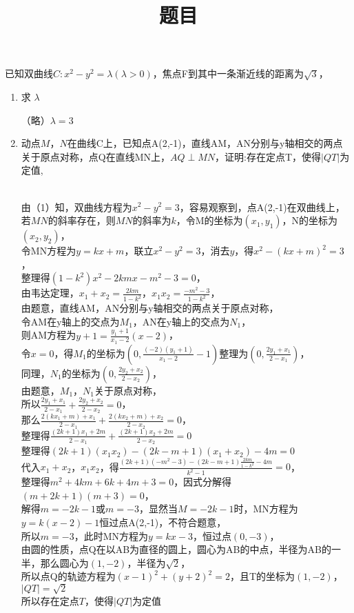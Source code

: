 \documentclass{exam-zh}
\title{题目}
\begin{document}
\begin{problem}
  已知双曲线$C:x^2-y^2=\lambda(\lambda>0)$，焦点F到其中一条渐近线的距离为$\sqrt{3}$，
  \begin{enumerate}
    \item 求 $ \lambda $ 
    \begin{solution}
      （略）$\lambda = 3$ 
    \end{solution}

    \item 动点$M$，$N$在曲线C上，已知点A(2,-1)，直线AM，AN分别与y轴相交的两点关于原点对称，点Q在直线MN上，$AQ\perp MN$，证明:存在定点T，使得$|QT|$为定值,
    \begin{solution}
\\      由（1）知，双曲线方程为$x^2-y^2=3$，容易观察到，点A(2,-1)在双曲线上，
\\     若$MN$的斜率存在，则$MN$的斜率为$k$，令M的坐标为$(x_1,y_1)$，N的坐标为$(x_2,y_2)$，
\\     令MN方程为$y=kx+m$，联立$x^2-y^2=3$，消去$y$，得$x^2-(kx+m)^2=3$，
\\     整理得$(1-k^2)x^2-2kmx-m^2-3=0$，
\\     由韦达定理，$x_1+x_2=\frac{2km}{1-k^2}$，$x_1x_2=\frac{-m^2-3}{1-k^2}$，
\\     由题意，直线AM，AN分别与y轴相交的两点关于原点对称，
\\     令AM在y轴上的交点为$M_1$，AN在y轴上的交点为$N_1$，
\\      则AM方程为$y+1=\frac{y_1+1}{x_1-2}(x-2)$，
\\      令$x=0$，得$M_1$的坐标为$(0,\frac{(-2)(y_1+1)}{x_1-2}-1)$整理为$(0,\frac{2y_1+x_1}{2-x_1})$，
\\      同理，$N_1$的坐标为$(0,\frac{2y_2+x_2}{2-x_2})$，
\\      由题意，$M_1$，$N_1$关于原点对称，
\\      所以$\frac{2y_1+x_1}{2-x_1}+\frac{2y_2+x_2}{2-x_2}=0$，
\\      那么$\frac{2(kx_1+m)+x_1}{2-x_1}+\frac{2(kx_2+m)+x_2}{2-x_2}=0$，
\\     整理得$\frac{(2k+1)x_1+2m}{2-x_1}+\frac{(2k+1)x_2+2m}{2-x_2}=0$
\\      整理得$(2k+1)(x_1x_2)-(2k-m+1)(x_1+x_2)-4m=0$
\\       代入$x_1+x_2$，$x_1x_2$，得$\frac{(2k+1)(-m^2-3)-(2k-m+1)\frac{2km}{1-k^2}-4m}{k^2-1}=0$，
\\     整理得$m^2+4km+6k+4m+3=0$，因式分解得$(m+2k+1)(m+3)=0$，
\\      解得$m=-2k-1$或$m=-3$，显然当$M=-2k-1$时，MN方程为$y=k(x-2)-1$恒过点A(2,-1)，不符合题意，
\\      所以$m=-3$，此时MN方程为$y=kx-3$，恒过点$(0,-3)$，
\\      由圆的性质，点Q在以AB为直径的圆上，圆心为AB的中点，半径为AB的一半，那么圆心为$(1,-2)$，半径为$\sqrt{2}$，
\\      所以点Q的轨迹方程为$(x-1)^2+(y+2)^2=2$，且T的坐标为$(1,-2)$，$|QT|=\sqrt{2}$
\\      所以存在定点$T$，使得$|QT|$为定值

    \end{solution}
  \end{enumerate}
\end{problem}
\end{document}
